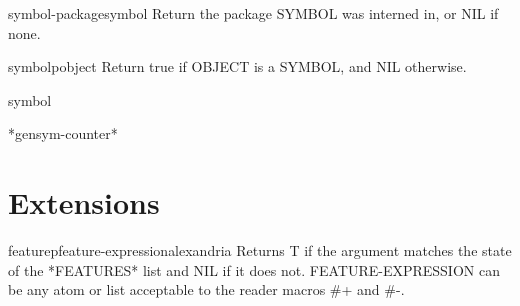 \begin{function}{symbol-package}{symbol}{}{}
  Return the package SYMBOL was interned in, or NIL if none.
\end{function}

\begin{function}{symbolp}{object}{}{}
  Return true if OBJECT is a SYMBOL, and NIL otherwise.
\end{function}

\begin{class}{symbol}{}{}{}
  
\end{class}

\begin{variable}{*gensym-counter*}{}{}{}
  
\end{variable}

\section{Extensions}
\label{sec:extensions}

\begin{function}{featurep}{feature-expression}{alexandria}{}
  Returns T if the argument matches the state of the *FEATURES*
list and NIL if it does not. FEATURE-EXPRESSION can be any atom
or list acceptable to the reader macros \#+ and \#-.
\end{function}
